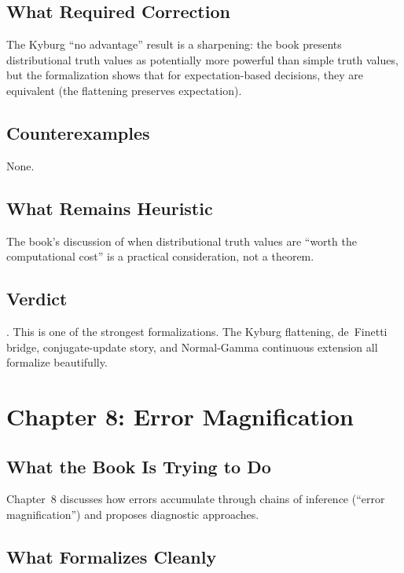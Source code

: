 \documentclass[11pt,openany]{report}
\begin{document}
\section{What Required Correction}

The Kyburg ``no advantage'' result is a sharpening: the book presents
distributional truth values as potentially more powerful than simple
truth values, but the formalization shows that for expectation-based
decisions, they are equivalent (the flattening preserves expectation).

\section{Counterexamples}

None.

\section{What Remains Heuristic}

The book's discussion of when distributional truth values are
``worth the computational cost'' is a practical consideration,
not a theorem.

\section{Verdict}

\verdictClean{}.  This is one of the strongest formalizations.
The Kyburg flattening, de~Finetti bridge, conjugate-update story,
and Normal-Gamma continuous extension all formalize beautifully.


\chapter{Chapter 8: Error Magnification}
\label{ch:review-ch8}

\section{What the Book Is Trying to Do}

Chapter~8 discusses how errors accumulate through chains of inference
(``error magnification'') and proposes diagnostic approaches.

\section{What Formalizes Cleanly}
\end{document}
